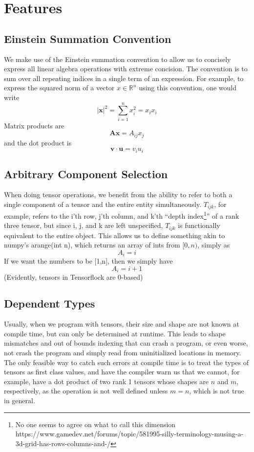 \documentclass[12pt]{article}
\begin{document}
\section{Features}
\subsection{Einstein Summation Convention}
We make use of the Einstein summation convention to allow us to concisely
express all linear algebra operations with extreme concision. The convention
is to sum over all repeating indices in a single term of an expression. For
example, to express the squared norm of a vector $x \in \mathbb{R}^n$ using
this convention, one would write \[ |\mathbf{x} |^2 = \sum_{i=1}^{n} x_i^2
= x_i x_i\] Matrix products are \[\mathbf{Ax} = A_{ij}x_{j}\] and the dot
product is \[\mathbf{v} \cdot \mathbf{u} = v_i u_i\]
\subsection{Arbitrary Component Selection}
When doing tensor operations, we benefit from the ability to refer to both a single component 
of a tensor and the entire entity simultaneously. $T_{ijk}$, for example, refers to the i'th row, j'th column,  and k'th ``depth index\footnote{No one seems to agree on what to call this dimension https://www.gamedev.net/forums/topic/581995-silly-terminology-musing-a-3d-grid-has-rows-columns-and-/}'' of a rank three tensor, but since i, j, and k are left unspecified, $T_{ijk}$ is functionally equivalent to the entire object. This allows us to define something akin to numpy's arange(int n), which returns an array of ints from $[0,n)$, simply as \[A_i = i\] If we want the numbers to be [1,n], then we simply have 
\[A_i = i+1\]
(Evidently, tensors in Tensorflock are 0-based)
\subsection{Dependent Types}
Usually, when we program with tensors, their size and shape are not known at compile time, but can only be determined at runtime. This leads to shape mismatches and out of bounds indexing that can crash a program, or even worse, not crash the program and simply read from uninitialized locations in memory. The only feasible way to catch such errors at compile time is to treat the types of tensors as first class values, and have the compiler warn us that we cannot, for example, have a dot product of two rank 1 tensors whose shapes are $n$ and $m$, respectively, as the operation is not well defined unless $m=n$, which is not true in general. 
\end{document}
